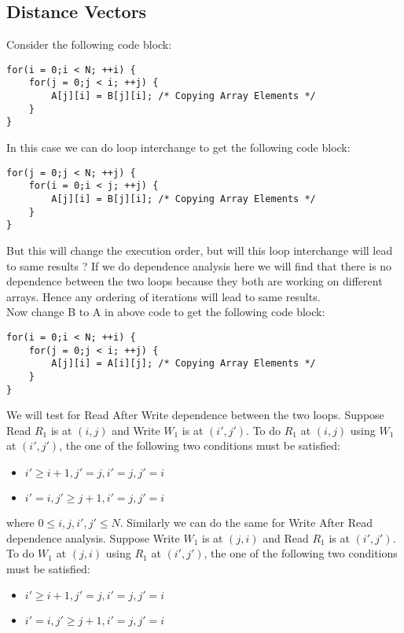 \documentclass{article}
\begin{document}
\subsection*{Distance Vectors}
Consider the following code block:
\begin{lstlisting}
for(i = 0;i < N; ++i) {
    for(j = 0;j < i; ++j) {
        A[j][i] = B[j][i]; /* Copying Array Elements */
    }
}
\end{lstlisting}
In this case we can do loop interchange to get the following code block:
\begin{lstlisting}
for(j = 0;j < N; ++j) {
    for(i = 0;i < j; ++j) {
        A[j][i] = B[j][i]; /* Copying Array Elements */
    }
}
\end{lstlisting}

But this will change the execution order, but will this loop interchange will lead to same results ? If we do dependence analysis here we will find that there is no dependence between the two loops because they both are working on different arrays. Hence any ordering of iterations will lead to same results. \\
Now change B to A in above code to get the following code block:
\begin{lstlisting}
for(i = 0;i < N; ++i) {
    for(j = 0;j < i; ++j) {
        A[j][i] = A[i][j]; /* Copying Array Elements */
    }
}
\end{lstlisting}
We will test for Read After Write dependence between the two loops. Suppose Read $R_1$ is at $(i,j)$ and Write $W_1$ is at $(i',j')$. To do $R_1$ at $(i,j)$ using $W_1$ at $(i',j')$, the one of the following two conditions must be satisfied:
\begin{itemize}
    \item $i' \geq i+1,j' = j, i' = j, j' = i$
    \item $i' = i, j' \geq j+1, i' = j, j' = i$
\end{itemize}

where $0 \leq i,j,i',j' \leq N$. Similarly we can do the same for Write After Read dependence analysis. Suppose Write $W_1$ is at $(j,i)$ and Read $R_1$ is at $(i',j')$. To do $W_1$ at $(j,i)$ using $R_1$ at $(i',j')$, the one of the following two conditions must be satisfied:
\begin{itemize}
    \item $i' \geq i+1,j' = j, i' = j, j' = i$
    \item $i' = i, j' \geq j+1, i' = j, j' = i$
\end{itemize}
\end{document}
